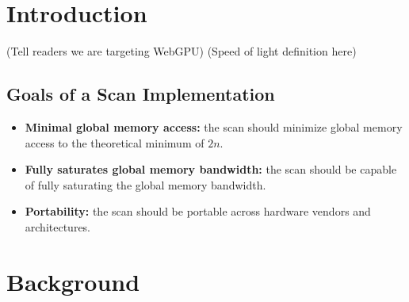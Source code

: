 \documentclass[sigconf]{acmart}
\begin{document}
\section{Introduction}
 (Tell readers we are targeting WebGPU)
 (Speed of light definition here)
\subsection{Goals of a Scan Implementation}
\begin{itemize}
  \item \textbf{Minimal global memory access:} the scan should minimize global memory access to the theoretical minimum of $2n$.
  \item \textbf{Fully saturates global memory bandwidth:} the scan should be capable of fully saturating the global memory bandwidth.
  \item \textbf{Portability:} the scan should be portable across hardware vendors and architectures.
\end{itemize}

\section{Background}
\end{document}
